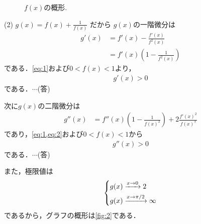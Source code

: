 \documentclass[a4paper,10pt]{ltjsarticle}
\begin{document}
\begin{multicols}{2}
  \begin{figure}[H]
    \centering
    \caption{$f(x)$の概形.}
    \label{fig:1}
  \end{figure}


  \vspace{10pt}
  (2)
  $g(x) = f(x) + \frac{1}{f(x)}$ だから
  $g(x)$の一階微分は
  \begin{align*}
    g'(x)
     & = f'(x) - \frac{f'(x)}{f^2(x)}           \\
     & = f'(x)\left(1 - \frac{1}{f^2(x)}\right)
  \end{align*}
  である．\cref{eq:1}および$0<f(x)<1$より，
  \begin{align}
    g'(x)>0 \label{eq:3}
  \end{align}
  である．$\cdots$(答)

  次に$g(x)$の二階微分は
  \begin{align*}
    g''(x)
     & = f''(x)\left(1 - \frac{1}{f(x)^2}\right) + 2 \frac{f'(x)^2}{f(x)^3}
  \end{align*}
  であり，\cref{eq:1,eq:2}および$0<f(x)<1$から
  \begin{align}
    g''(x)>0 \label{eq:4}
  \end{align}
  である．$\cdots$(答)

  また，極限値は
  \begin{align*}
    \begin{dcases}
      g(x) \xrightarrow{x \to 0} 2 \\
      g(x) \xrightarrow{x \to \pi/2} \infty
    \end{dcases}
  \end{align*}
  であるから，グラフの概形は\cref{fig:2}である．


\end{multicols}
\end{document}

